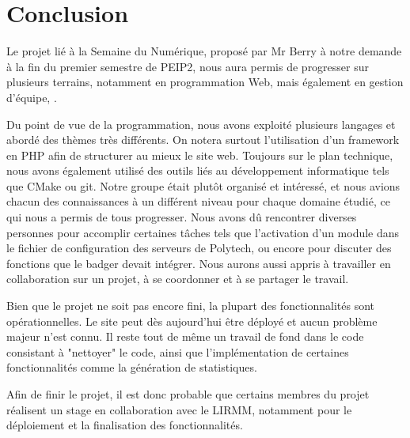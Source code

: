 \chapter{Conclusion}

Le projet lié à la Semaine du Numérique, proposé par Mr Berry à notre demande à la
fin du premier semestre de PEIP2, nous aura permis de progresser sur plusieurs terrains,
notamment en programmation Web, mais également en gestion d'équipe, .

Du point de vue de la programmation, nous avons exploité plusieurs langages et abordé
des thèmes très différents.
On notera surtout l'utilisation d'un framework en PHP afin de structurer au mieux le site web.
Toujours sur le plan technique, nous avons également utilisé des outils liés au développement
informatique tels que CMake ou git.
Notre groupe était plutôt organisé et intéressé, et nous avions chacun des connaissances à
un différent niveau pour chaque domaine étudié, ce qui nous a permis de tous progresser.
Nous avons dû rencontrer diverses personnes pour accomplir certaines tâches tels que l'activation
d'un module dans le fichier de configuration des serveurs de Polytech, ou encore pour discuter des fonctions
que le badger devait intégrer.
Nous aurons aussi appris à travailler en collaboration sur un projet, à se coordonner et
à se partager le travail.

Bien que le projet ne soit pas encore fini, la plupart des fonctionnalités sont opérationnelles.
Le site peut dès aujourd'hui être déployé et aucun problème majeur n'est connu. 
Il reste tout de même un travail de fond dans le code consistant à "nettoyer" le code, ainsi que
l'implémentation de certaines fonctionnalités comme la génération de statistiques.

Afin de finir le projet, il est donc probable que certains membres du projet réalisent un stage
en collaboration avec le LIRMM, notamment pour le déploiement et la finalisation des fonctionnalités.
